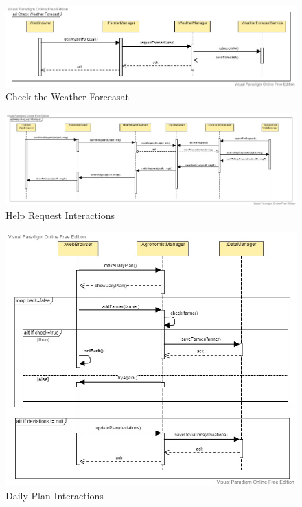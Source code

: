 \documentclass[table, 12pt]{article}
\begin{document}
\begin{center}
    \begin{figure}[H]
        \includegraphics[scale=0.42, center]{assets/SequenceDiagram/Forecast.jpg}
        \caption{Check the Weather Forecasat}
        \label{fig: forecast}
    \end{figure}
\end{center}

\begin{center}
    \begin{figure}[H]
        \includegraphics[scale=0.42, center]{assets/SequenceDiagram/HelpRequest.jpg}
        \caption{Help Request Interactions}
        \label{fig: helpRequest}
    \end{figure}
\end{center}

\begin{center}
    \begin{figure}[H]
        \includegraphics[scale=0.42, center]{assets/SequenceDiagram/DailyPlan.jpg}
        \caption{Daily Plan Interactions}
        \label{fig: dailyPlan}
    \end{figure}
\end{center}
\end{document}
